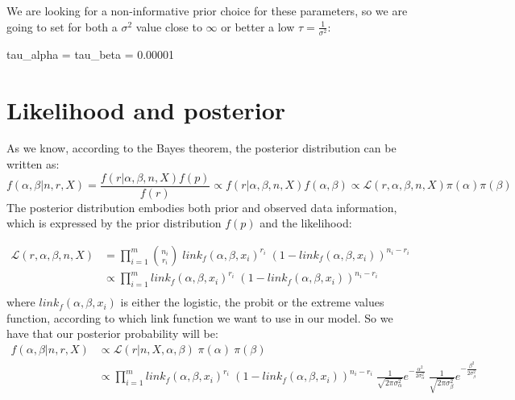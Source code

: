 \documentclass[]{article}
\newenvironment{Shaded}{\begin{snugshade}}{\end{snugshade}}
\newcommand{\FloatTok}[1]{\textcolor[rgb]{0.00,0.00,0.81}{#1}}
\newcommand{\NormalTok}[1]{#1}
\newcommand{\StringTok}[1]{\textcolor[rgb]{0.31,0.60,0.02}{#1}}
\begin{document}
We are looking for a non-informative prior choice for these parameters,
so we are going to set for both a \(\sigma^2\) value close to \(\infty\)
or better a low \(\tau = \frac{1}{\sigma^2}\):

\begin{Shaded}
\begin{Highlighting}[]
\NormalTok{  tau_alpha =}\StringTok{ }\NormalTok{tau_beta =}\StringTok{ }\FloatTok{0.00001}
\end{Highlighting}
\end{Shaded}

\hypertarget{likelihood-and-posterior}{%
\section{Likelihood and posterior}\label{likelihood-and-posterior}}

As we know, according to the Bayes theorem, the posterior distribution
can be written as:
\[f(\alpha,\beta | n, r, X) = \frac{f(r | \alpha,\beta, n, X) f(p)}{ f(r)} \propto f(r | \alpha,\beta, n, X) f(\alpha,\beta) \propto  \mathcal{L}(r, \alpha,\beta, n, X) \pi(\alpha) \pi(\beta)\]
The posterior distribution embodies both prior and observed data
information, which is expressed by the prior distribution \(f(p)\) and
the likelihood:

\[
\begin{aligned} 
  \mathcal{L}(r, \alpha,\beta,n, X) &= \prod_{i = 1}^{m}{\displaystyle {\binom {n_i}{r_i}} \; link_f(\alpha,\beta, x_i)^{r_i}\;(1-link_f(\alpha,\beta, x_i))^{n_i-r_i}}\\
                        &\propto \prod_{i = 1}^{m}{ link_f(\alpha,\beta, x_i)^{r_i}\;(1-link_f(\alpha,\beta, x_i))^{n_i-r_i}}\\
\end{aligned}
\] where \(link_f(\alpha,\beta, x_i)\) is either the logistic, the
probit or the extreme values function, according to which link function
we want to use in our model. So we have that our posterior probability
will be: \[
\begin{aligned} 
  f(\alpha,\beta | n, r, X) &\propto \mathcal{L}(r | n, X, \alpha, \beta) \; \pi(\alpha) \: \pi(\beta)\\
                  &\propto \prod_{i = 1}^{m}{ link_f(\alpha,\beta, x_i)^{r_i}\;(1-link_f(\alpha,\beta, x_i))^{n_i-r_i}} \; \frac{1}{\sqrt{2\pi\sigma_{\alpha}^{2}}} e^{-\frac{\alpha^2}{2\sigma_{\alpha}^{2}}} \: \frac{1}{\sqrt{2\pi\sigma_{\beta}^{2}}} e^{-\frac{\beta^2}{2\sigma_{\beta}^{2}}}\\
\end{aligned} 
\]
\end{document}
